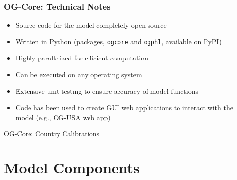 \documentclass{beamer}
\begin{document}
  \begin{frame}
  \frametitle{OG-Core: Technical Notes}
  \begin{itemize}
    \item Source code for the model completely open source
    \vspace{2mm}
    \item Written in Python (packages, \href{https://pypi.org/project/ogcore/}{\texttt{ogcore}} and \href{https://pypi.org/project/ogphl /}{\texttt{ogphl}}, available on \href{https://pypi.org/project/ogcore/}{PyPI})
    \vspace{2mm}
    \item Highly parallelized for efficient computation
    \vspace{2mm}
    \item Can be executed on any operating system
    \vspace{2mm}
    \item Extensive unit testing to ensure accuracy of model functions
    \vspace{2mm}
    \item Code has been used to create GUI web applications to interact with the model (e.g., OG-USA web app)
  \end{itemize}
  \end{frame}

  \begin{frame}{OG-Core: Country Calibrations}
  \end{frame}


\section{Model Components}
\end{document}
